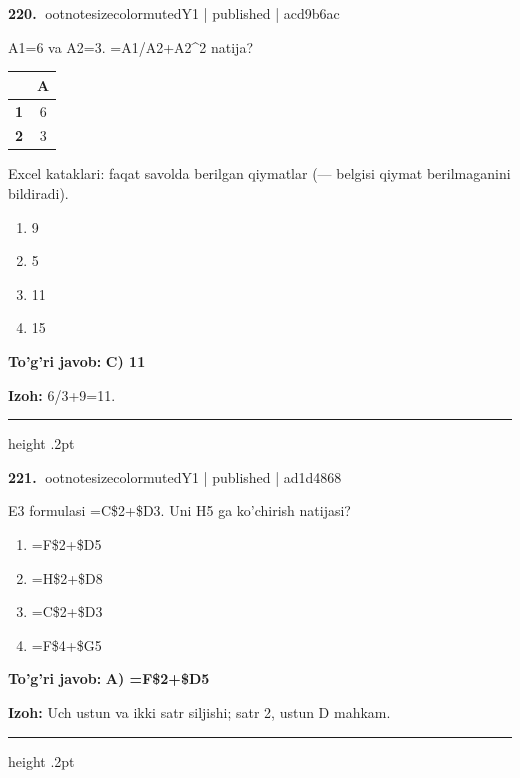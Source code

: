 \documentclass[10pt,a4paper]{article}
\begin{document}
\textbf{\color{ink}220.} {ootnotesizecolor{muted}Y1 | published | acd9b6ac}
\par
A1=6 va A2=3. =A1/A2+A2\textasciicircum{}2 natija?
\begin{center}\begingroup\small\setlength{\tabcolsep}{9pt}\renewcommand{\arraystretch}{1.28}
\begin{tabular}{|>{\columncolor{gray!12}}c|c|}
\hline
\rowcolor{gray!12} \textbf{} & \textbf{A}\\ \hline
\textbf{1} & 6\\ \hline
\textbf{2} & 3\\ \hline
\end{tabular}\endgroup\par{\footnotesize\color{muted}Excel kataklari: faqat savolda berilgan qiymatlar (--- belgisi qiymat berilmaganini bildiradi).}\end{center}
\begin{enumerate}[label=\Alph*),leftmargin=9mm]
\item 9
\item 5
\item 11
\item 15
\end{enumerate}
\begin{tcolorbox}[enhanced,breakable,colback=teal!4,colframe=teal!55!black,boxrule=0.45pt,arc=1.2mm,left=2.8mm,right=2.8mm,top=2mm,bottom=2mm]
\textbf{\color{teal}To'g'ri javob:} \textbf{C) 11}
\par\smallskip
\textbf{Izoh:} 6/3+9=11.
\end{tcolorbox}
\vspace{2mm}\hrule height .2pt\vspace{2mm}

\textbf{\color{ink}221.} {ootnotesizecolor{muted}Y1 | published | ad1d4868}
\par
E3 formulasi =C\$2+\$D3. Uni H5 ga ko'chirish natijasi?
\begin{enumerate}[label=\Alph*),leftmargin=9mm]
\item =F\$2+\$D5
\item =H\$2+\$D8
\item =C\$2+\$D3
\item =F\$4+\$G5
\end{enumerate}
\begin{tcolorbox}[enhanced,breakable,colback=teal!4,colframe=teal!55!black,boxrule=0.45pt,arc=1.2mm,left=2.8mm,right=2.8mm,top=2mm,bottom=2mm]
\textbf{\color{teal}To'g'ri javob:} \textbf{A) =F\$2+\$D5}
\par\smallskip
\textbf{Izoh:} Uch ustun va ikki satr siljishi; satr 2, ustun D mahkam.
\end{tcolorbox}
\vspace{2mm}\hrule height .2pt\vspace{2mm}
\end{document}
